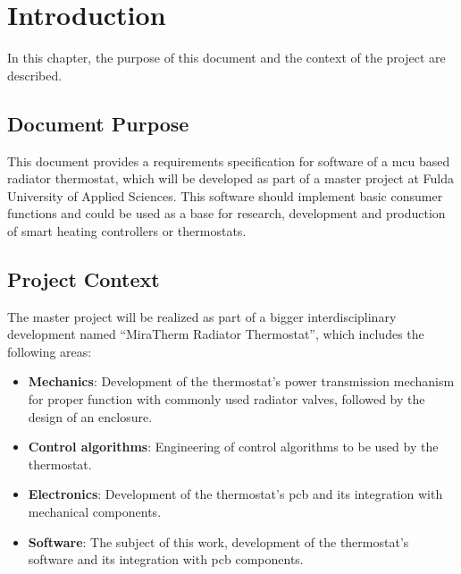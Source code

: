 %
%

\chapter{Introduction}
\label{chap:Introduction}
In this chapter, the purpose of this document and the context of the project are described.

\section{Document Purpose}
This document provides a requirements specification for software of a \ac{mcu} based radiator thermostat, which will be developed as part of a master project at Fulda University of Applied Sciences. This software should implement basic consumer functions and could be used as a base for research, development and production of smart heating controllers or thermostats.

\section{Project Context}
The master project will be realized as part of a bigger interdisciplinary development named ``MiraTherm Radiator Thermostat'', which includes the following areas:

\begin{itemize}
	\item \textbf{Mechanics}: Development of the thermostat's power transmission mechanism for proper function with commonly used radiator valves, followed by the design of an enclosure.
	\item \textbf{Control algorithms}: Engineering of control algorithms to be used by the thermostat.
	\item \textbf{Electronics}: Development of the thermostat's \ac{pcb} and its integration with mechanical components.
	\item \textbf{Software}: The subject of this work, development of the thermostat's software and its integration with \acs{pcb} components.
\end{itemize}